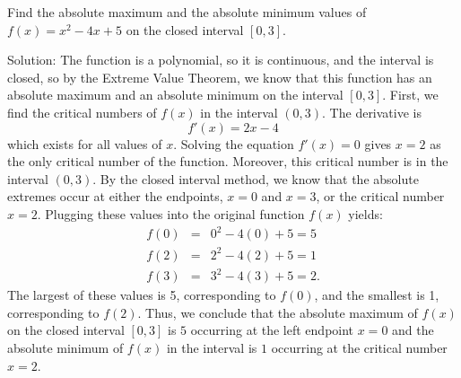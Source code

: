 \documentclass[handout]{ximera}
\begin{document}
\begin{example}[example 1] Find the absolute maximum and the absolute minimum values of $f(x) = x^2 - 4x + 5$ on the closed interval $[0, 3]$.

Solution:  The function is a polynomial, so it is continuous, and the interval is closed, 
so by the Extreme Value Theorem, we know that this function has an absolute maximum and an absolute minimum on the interval $[0,3]$.
First, we find the critical numbers of $f(x)$ in the interval $(0, 3)$. 
The derivative is 
\[
f'(x) = 2x - 4
\]
which exists for all values of $x$.
Solving the equation $f'(x) =0$ gives $x=2$ as the only critical number of the function.
Moreover, this critical number is in the interval $(0,3)$.
By the closed interval method, we know that the absolute extremes occur at either the endpoints, $x=0$ and $x = 3$, or the critical number $x = 2$.  
Plugging these values into the original function $f(x)$ yields:
\begin{eqnarray*}
f(0) &=& 0^2 - 4(0) + 5 =5\\
f(2) &=& 2^2 - 4(2) + 5 = 1\\
f(3) &=& 3^2 - 4(3) + 5 = 2.
\end{eqnarray*}
The largest of these values is 5, corresponding to $f(0)$, and the smallest is 1, corresponding to $f(2)$. 
Thus, we conclude that the absolute maximum of $f(x)$ on the closed interval $[0,3]$ is $5$ occurring 
at the left endpoint $x = 0$ and the absolute minimum of $f(x)$ in the interval is $1$
occurring at the critical number $x = 2$.
\begin{image}
\end{image}
\end{example}
\end{document}
